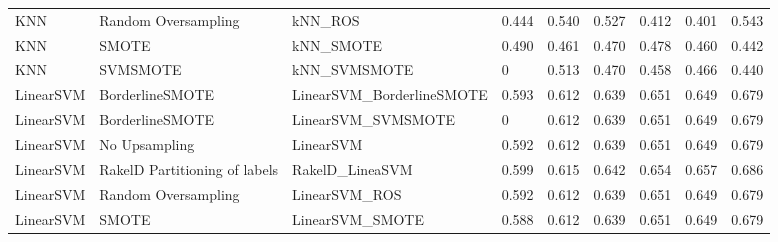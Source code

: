 \begin{tabular}{lllllllll}
                            KNN &           Random Oversampling &                                      kNN\_ROS & 0.444 &                     0.540 &                 0.527 &                  0.412 &                                   0.401 &     0.543 \\
                            KNN &                         SMOTE &                                    kNN\_SMOTE & 0.490 &                     0.461 &                 0.470 &                  0.478 &                                   0.460 &     0.442 \\
                            KNN &                      SVMSMOTE &                                 kNN\_SVMSMOTE &     0 &                     0.513 &                 0.470 &                  0.458 &                                   0.466 &     0.440 \\
                      LinearSVM &               BorderlineSMOTE &                    LinearSVM\_BorderlineSMOTE & 0.593 &                     0.612 &                 0.639 &                  0.651 &                                   0.649 &     0.679 \\
                      LinearSVM &               BorderlineSMOTE &                           LinearSVM\_SVMSMOTE &     0 &                     0.612 &                 0.639 &                  0.651 &                                   0.649 &     0.679 \\
                      LinearSVM &                 No Upsampling &                                    LinearSVM & 0.592 &                     0.612 &                 0.639 &                  0.651 &                                   0.649 &     0.679 \\
                      LinearSVM & RakelD Partitioning of labels &                              RakelD\_LineaSVM & 0.599 &                     0.615 &                 0.642 &                  0.654 &                                   0.657 &     0.686 \\
                      LinearSVM &           Random Oversampling &                                LinearSVM\_ROS & 0.592 &                     0.612 &                 0.639 &                  0.651 &                                   0.649 &     0.679 \\
                      LinearSVM &                         SMOTE &                              LinearSVM\_SMOTE & 0.588 &                     0.612 &                 0.639 &                  0.651 &                                   0.649 &     0.679 \\

\end{tabular}
